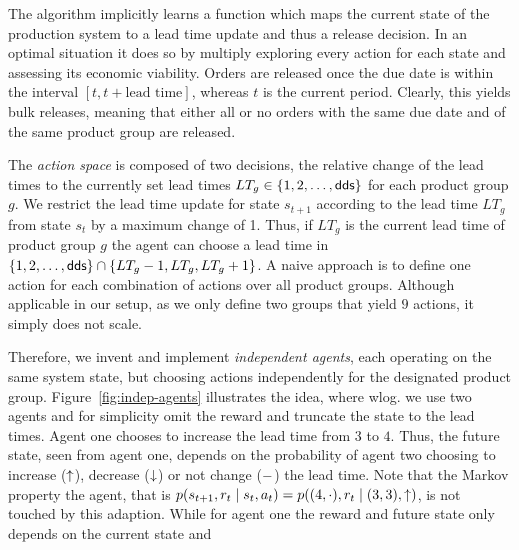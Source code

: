 \documentclass[envcountsame]{llncs}
\begin{document}
The algorithm implicitly learns a function which maps the current state of the production
system to a lead time update and thus a release decision. In an optimal situation it does so by
multiply exploring every action for each state and assessing its economic viability.
%
Orders are released once the due date is within the interval $[t,t+\text{lead time}]$, whereas $t$
is the current period. Clearly, this yields bulk releases, meaning that either all or no orders with
the same due date and of the same product group are
released.

The \textit{action space} is composed of two decisions, the relative change of the lead times to the
currently set lead times $LT_{g} \in \{1,2,\ldots,\textsf{dds}\}$ for each product group $g$.
%
We restrict the lead time update for state $s_{t+1}$ according to the lead time $LT_{g}$ from state
$s_{t}$ by a maximum change of 1. Thus, if $LT_{g}$ is the current lead time of product group $g$
the agent can choose a lead time in $\{1,2,\ldots,\textsf{dds}\} \cap \{LT_{g}-1,LT_{g},LT_{g}+1\}$. %
A naive approach is to define one action for each combination of actions over all product groups.
Although applicable in our setup, as we only define two groups that yield \(9\) actions, it simply
does not scale.
%
\begin{figure*}[t!]
  \centering
  \caption{Illustration of independent agents as agent one increases the lead time}\label{fig:indep-agents}
\end{figure*}
%
Therefore, we invent and implement \textit{independent agents}, each operating on the same system
state, but choosing actions independently for the designated product group.
Figure~\ref{fig:indep-agents} illustrates the idea, where wlog. we use two agents and for simplicity
omit the reward and truncate the state to the lead times. Agent one chooses to increase the lead
time from \(3\) to \(4\). Thus, the future state, seen from agent one, depends on the probability of
agent two choosing to increase (\(\uparrow\)), decrease (\(\downarrow\)) or not change (\(-\)) the lead
time. Note that the Markov property the agent, that is
\(p(s_{t+1}, r_{t} \mid s_{t}, a_{t}) = p((4,\cdot), r_{t} \mid (3,3), \uparrow) \), is not touched by
this adaption. While for agent one the reward and future state only depends on the current state and
\end{document}
